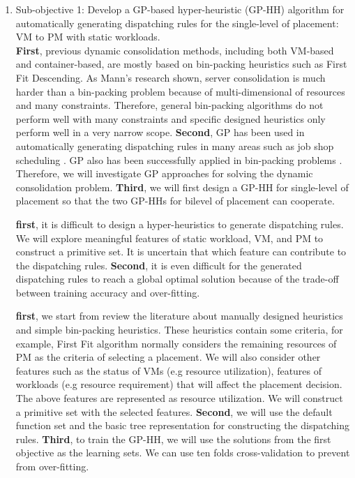 \begin{enumerate}

	\item Sub-objective 1: Develop a GP-based hyper-heuristic (GP-HH) algorithm for automatically generating dispatching rules for the single-level of placement:  VM to PM with static workloads. \\

	 \textbf{First}, previous dynamic consolidation methods, including both VM-based and container-based, are mostly based on bin-packing heuristics such as First Fit Descending. As Mann's research \cite{Mann:2015ua} shown, server consolidation is much harder than a bin-packing problem because of multi-dimensional of resources and many constraints. Therefore, general bin-packing algorithms do not perform well with many constraints and specific designed heuristics only perform well in a very narrow scope. \textbf{Second}, GP has been used in automatically generating dispatching rules in many areas such as job shop scheduling \cite{Nguyen:2014eu}. GP also has been successfully applied in bin-packing problems \cite{Burke:2006ei}. Therefore, we will investigate GP approaches for solving the dynamic consolidation problem. \textbf{Third}, we will first design a GP-HH for single-level of placement so that the two GP-HHs for bilevel of placement can cooperate.

	 \textbf{first}, it is difficult to design a hyper-heuristics to generate dispatching rules. We will explore meaningful features of static workload, VM, and PM to construct a primitive set. It is uncertain that which feature can contribute to the dispatching rules.  \textbf{Second}, it is even difficult for the generated dispatching rules to reach a global optimal solution because of the trade-off between training accuracy and over-fitting.

	 \textbf{first}, we start from review the literature about manually designed heuristics and simple bin-packing heuristics. These heuristics contain some criteria, for example, First Fit algorithm normally considers the remaining resources of PM as the criteria of selecting a placement. We will also consider other features such as the status of VMs (e.g resource utilization), features of workloads (e.g resource requirement) that will affect the placement decision. The above features are represented as resource utilization. We will construct a primitive set with the selected features. 
	\textbf{Second}, we will use the default function set and the basic tree representation for constructing the dispatching rules. 
	\textbf{Third}, to train the GP-HH, we will use the solutions from the first objective as the learning sets. We can use ten folds cross-validation to prevent from over-fitting. 


\end{enumerate}
